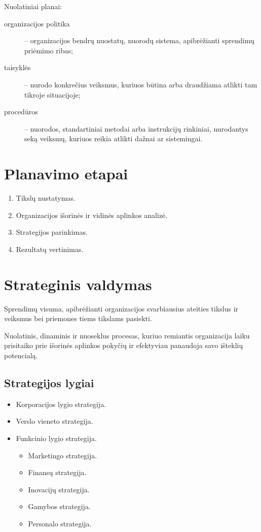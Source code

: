 Nuolatiniai planai:
\begin{description}
  \item[organizacijos politika] – organizacijos bendrų nuostatų, nuorodų
    sistema, apibrėžianti sprendimų priėmimo ribas;
  \item[taisyklės] – nurodo konkrečius veiksmus, kuriuos būtina arba
    draudžiama atlikti tam tikroje situacijoje;
  \item[procedūros] – nuorodos, standartiniai metodai arba instrukcijų
    rinkiniai, nurodantys seką veiksmų, kuriuos reikia atlikti dažnai
    ar sistemingai.
\end{description}

\section{Planavimo etapai}

\begin{enumerate}
  \item Tikslų nustatymas.
  \item Organizacijos išorinės ir vidinės aplinkos analizė.
  \item Strategijos parinkimas.
  \item Rezultatų vertinimas.
\end{enumerate}

\section{Strateginis valdymas}

\begin{defn}[Strategija]
  Sprendimų visuma, apibrėžianti organizacijos svarbiausius ateities
  tikslus ir veiksmus bei priemones tiems tikslams pasiekti.
\end{defn}

\begin{defn}
  Nuolatinis, dinaminis ir nuoseklus procesas, kuriuo remiantis
  organizacija laiku prisitaiko prie išorinės aplinkos pokyčių ir
  efektyviau panaudoja savo išteklių potencialą.
\end{defn}

\subsection{Strategijos lygiai}
  
\begin{itemize}
  \item Korporacijos lygio strategija.
  \item Verslo vieneto strategija.
  \item Funkcinio lygio strategija.
  \begin{itemize}
    \item Marketingo strategija.
    \item Finansų strategija.
    \item Inovacijų strategija.
    \item Gamybos strategija.
    \item Personalo strategija.
  \end{itemize}
\end{itemize}


